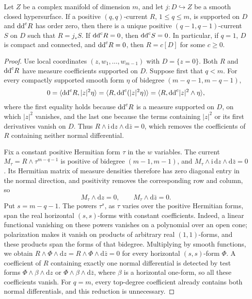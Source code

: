 \begin{lemma}\label{lem:smooth-hypersurface-current-support}
Let $Z$ be a complex manifold of dimension $m$, and let $j\colon D\hookrightarrow Z$ be a smooth closed hypersurface. If a positive $(q,q)$-current $R$, $1\leq q\leq m$, is supported on $D$ and $\mathrm{dd}^{\mathrm{c}} R$ has order zero, then there is a unique positive $(q-1,q-1)$-current $S$ on $D$ such that $R=j_*S$. If $\mathrm{dd}^{\mathrm{c}} R=0$, then $\mathrm{dd}^{\mathrm{c}} S=0$. In particular, if $q=1$, $D$ is compact and connected, and $\mathrm{dd}^{\mathrm{c}} R=0$, then $R=c[D]$ for some $c\geq0$.
\end{lemma}
\begin{proof}
Use local coordinates $(z,w_1,\ldots,w_{m-1})$ with $D=\{z=0\}$. Both $R$ and $\mathrm{dd}^{\mathrm{c}} R$ have measure coefficients supported on $D$. Suppose first that $q<m$. For every compactly supported smooth form $\eta$ of bidegree $(m-q-1,m-q-1)$,
\[
 0=\langle\mathrm{dd}^{\mathrm{c}} R,|z|^2\eta\rangle
  =\langle R,\mathrm{dd}^{\mathrm{c}}(|z|^2\eta)\rangle
  =\langle R,\mathrm{dd}^{\mathrm{c}}|z|^2\wedge\eta\rangle,
\]
where the first equality holds because $\mathrm{dd}^{\mathrm{c}} R$ is a measure supported on $D$, on which $|z|^2$ vanishes, and the last one because the terms containing $|z|^2$ or its first derivatives vanish on $D$. Thus $R\wedge\mathrm{i}\,\mathrm{d}z\wedge\mathrm{d}\bar z=0$, which removes the coefficients of $R$ containing neither normal differential.

Fix a constant positive Hermitian form $\tau$ in the $w$ variables. The current $M_\tau=R\wedge\tau^{m-q-1}$ is positive of bidegree $(m-1,m-1)$, and
$M_\tau\wedge\mathrm{i}\,\mathrm{d}z\wedge\mathrm{d}\bar z=0$.
Its Hermitian matrix of measure densities therefore has zero diagonal entry in the normal direction, and positivity removes the corresponding row and column, so
\[
 M_\tau\wedge\mathrm{d}z=0,
 \qquad M_\tau\wedge\mathrm{d}\bar z=0.
\]
Put $s=m-q-1$. The powers $\tau^s$, as $\tau$ varies over the positive Hermitian forms, span the real horizontal $(s,s)$-forms with constant coefficients. Indeed, a linear functional vanishing on these powers vanishes on a polynomial over an open cone; polarization makes it vanish on products of arbitrary real $(1,1)$-forms, and these products span the forms of that bidegree. Multiplying by smooth functions, we obtain $R\wedge\Phi\wedge\mathrm{d}z=R\wedge\Phi\wedge\mathrm{d}\bar z=0$ for every horizontal $(s,s)$-form $\Phi$. A coefficient of $R$ containing exactly one normal differential is detected by test forms $\Phi\wedge\beta\wedge\mathrm{d}z$ or $\Phi\wedge\beta\wedge\mathrm{d}\bar z$, where $\beta$ is a horizontal one-form, so all these coefficients vanish. For $q=m$, every top-degree coefficient already contains both normal differentials, and this reduction is unnecessary.


\end{proof}
